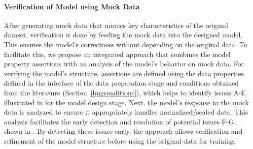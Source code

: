 \paragraph{Verification of Model using Mock Data}
After generating mock data that mimics key characteristics of the original dataset, verification is done by feeding the mock data into the designed model. This ensures the model's correctness without depending on the original data. To facilitate this, we propose an integrated approach that combines the model property assertions with an analysis of the model's behavior on mock data. For verifying the model’s 
structure,
assertions are defined using the data properties defined in the interface of the data preparation stage and conditions obtained from the literature
(Section~\ref{bugconditions}), which helps to identify issues 
A-E illustrated in  for the model design stage. Next, the model's response to the mock data is analyzed to ensure it appropriately handles normalized/scaled data. This analysis facilitates the early detection and resolution of potential issues F-G, shown in .
By detecting these issues early, the approach allows verification and refinement of the 
model structure before using the original data for training.

